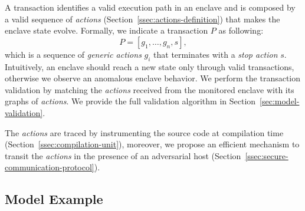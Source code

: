 A transaction identifies a valid execution path in an enclave and
is composed by a valid sequence of \emph{actions} 
(Section~\ref{ssec:actions-definition}) that makes the enclave state 
evolve.
%
Formally, we indicate a transaction $P$ as following: 
$$
P = [g_1, \dots, g_n, s],
$$
which is a sequence of \emph{generic actions} $g_i$ that terminates with a 
\emph{stop action} $s$.
Intuitively, an enclave should reach a new state only through valid 
transactions, otherwise we observe an anomalous enclave behavior.
We perform the transaction validation by matching the \emph{actions} received
from the monitored enclave with its graphs of \emph{actions}.
We provide the full validation algorithm in Section~\ref{sec:model-validation}.

The \emph{actions} are traced by instrumenting the source code at compilation 
time (Section~\ref{ssec:compilation-unit}), moreover, we propose an 
efficient mechanism to transit the \emph{actions} in the presence of an 
adversarial host 
(Section~\ref{ssec:secure-communication-protocol}).


\subsection{Model Example}
\label{ssec:running-example}

